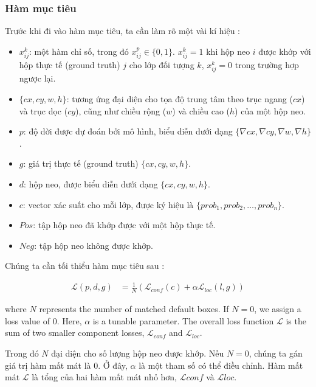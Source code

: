 \documentclass[a4paper]{article}
\begin{document}
\subsubsection{\textbf{Hàm mục tiêu}}

Trước khi đi vào hàm mục tiêu, ta cần làm rõ một vài kí hiệu :

\begin{itemize}
	\item $x_{ij}^k$: một hàm chỉ số, trong đó $x_{ij}^p \in \lbrace 0, 1 \rbrace$. $x_{ij}^k = 1$ khi hộp neo $i$ được khớp với hộp thực tế (ground truth) $j$ cho lớp đối tượng $k$, $x_{ij}^k = 0$ trong trường hợp ngược lại.
	\item $\lbrace cx, cy, w, h \rbrace$: tương ứng đại diện cho tọa độ trung tâm theo trục ngang ($cx$) và trục dọc ($cy$), cũng như chiều rộng ($w$) và chiều cao ($h$) của một hộp neo. 
	\item $p$: độ dời được dự đoán bởi mô hình, biểu diễn dưới dạng $\lbrace \nabla{cx}, \nabla{cy}, \nabla{w}, \nabla{h} \rbrace$.
	\item $g$: giá trị thực tế (ground truth) $\lbrace cx, cy, w, h \rbrace$. 
	\item $d$: hộp neo, được biểu diễn dưới dạng $\lbrace cx, cy, w, h \rbrace$. 
	\item $c$: vector xác suất cho mỗi lớp, được ký hiệu là $\lbrace prob_1, prob_2, \ldots, prob_n \rbrace$. 
	\item $Pos$: tập hộp neo đã khớp được với một hộp thực tế. 
	\item $Neg$: tập hộp neo không được khớp. 
\end{itemize}

Chúng ta cần tối thiểu hàm mục tiêu sau : 

\begin{align}
	\mathcal{L}(p, d, g) &= \frac{1}{N}(\mathcal{L}_{conf}(c) + \alpha \mathcal{L}_{loc}(l, g)) 
\end{align} 

where $N$ represents the number of matched default boxes. If $N=0$, we assign a loss value of $0$. Here, $\alpha$ is a tunable parameter. The overall loss function $\mathcal{L}$ is the sum of two smaller component losses, $\mathcal{L}_{conf}$ and $\mathcal{L}_{loc}$.

Trong đó $N$ đại diện cho số lượng hộp neo được khớp. Nếu $N=0$, chúng ta gán giá trị hàm mất mát là $0$. Ở đây, $\alpha$ là một tham số có thể điều chỉnh. Hàm mất mát $\mathcal{L}$ là tổng của hai hàm mất mát nhỏ hơn, $\mathcal{L}{conf}$ và $\mathcal{L}{loc}$. \\
\end{document}
